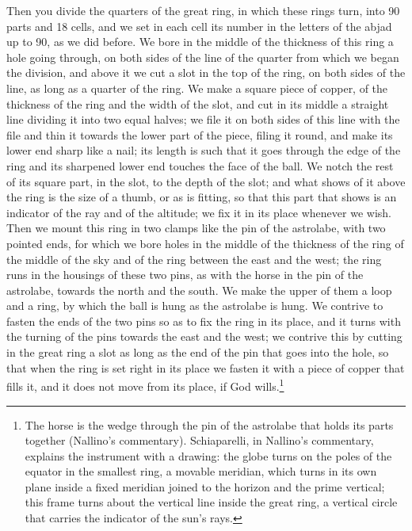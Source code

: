 \documentclass[11pt]{article}
\begin{document}
\par Then you divide the quarters of the great ring, in which these rings turn, into 90 parts and 18 cells, and we set in each cell its number in the letters of the abjad up to 90, as we did before. We bore in the middle of the thickness of this ring a hole going through, on both sides of the line of the quarter from which we began the division, and above it we cut a slot in the top of the ring, on both sides of the line, as long as a quarter of the ring. We make a square piece of copper, of the thickness of the ring and the width of the slot, and cut in its middle a straight line dividing it into two equal halves; we file it on both sides of this line with the file and thin it towards the lower part of the piece, filing it round, and make its lower end sharp like a nail; its length is such that it goes through the edge of the ring and its sharpened lower end touches the face of the ball. We notch the rest of its square part, in the slot, to the depth of the slot; and what shows of it above the ring is the size of a thumb, or as is fitting, so that this part that shows is an indicator of the ray and of the altitude; we fix it in its place whenever we wish. Then we mount this ring in two clamps like the pin of the astrolabe, with two pointed ends, for which we bore holes in the middle of the thickness of the ring of the middle of the sky and of the ring between the east and the west; the ring runs in the housings of these two pins, as with the horse in the pin of the astrolabe, towards the north and the south. We make the upper of them a loop and a ring, by which the ball is hung as the astrolabe is hung. We contrive to fasten the ends of the two pins so as to fix the ring in its place, and it turns with the turning of the pins towards the east and the west; we contrive this by cutting in the great ring a slot as long as the end of the pin that goes into the hole, so that when the ring is set right in its place we fasten it with a piece of copper that fills it, and it does not move from its place, if God wills.\footnote{The horse is the wedge through the pin of the astrolabe that holds its parts together (Nallino's commentary). Schiaparelli, in Nallino's commentary, explains the instrument with a drawing: the globe turns on the poles of the equator in the smallest ring, a movable meridian, which turns in its own plane inside a fixed meridian joined to the horizon and the prime vertical; this frame turns about the vertical line inside the great ring, a vertical circle that carries the indicator of the sun's rays.}\par
\end{document}
